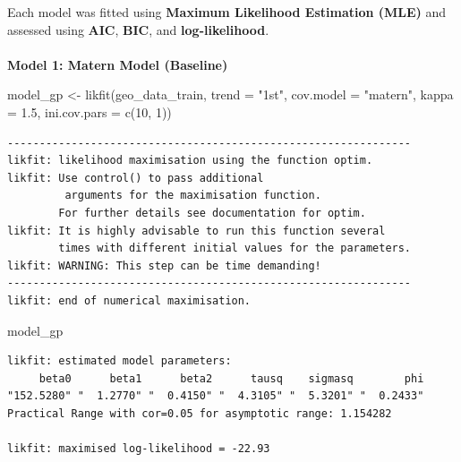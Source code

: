 \documentclass[
  11pt,
]{article}
\makeatletter
\let\oldparagraph\paragraph
\renewcommand{\paragraph}{
    \@ifstar
      \xxxParagraphStar
      \xxxParagraphNoStar
  }
\newcommand{\xxxParagraphStar}[1]{\oldparagraph*{#1}\mbox{}}
\newcommand{\xxxParagraphNoStar}[1]{\oldparagraph{#1}\mbox{}}
\newenvironment{Shaded}{\begin{snugshade}}{\end{snugshade}}
\newcommand{\AttributeTok}[1]{\textcolor[rgb]{0.40,0.45,0.13}{#1}}
\newcommand{\DecValTok}[1]{\textcolor[rgb]{0.68,0.00,0.00}{#1}}
\newcommand{\FloatTok}[1]{\textcolor[rgb]{0.68,0.00,0.00}{#1}}
\newcommand{\FunctionTok}[1]{\textcolor[rgb]{0.28,0.35,0.67}{#1}}
\newcommand{\NormalTok}[1]{\textcolor[rgb]{0.00,0.23,0.31}{#1}}
\newcommand{\OtherTok}[1]{\textcolor[rgb]{0.00,0.23,0.31}{#1}}
\newcommand{\StringTok}[1]{\textcolor[rgb]{0.13,0.47,0.30}{#1}}
\makeatother
\begin{document}
Each model was fitted using \textbf{Maximum Likelihood Estimation (MLE)}
and assessed using \textbf{AIC}, \textbf{BIC}, and
\textbf{log-likelihood}.

\paragraph{\texorpdfstring{\textbf{Model 1: Matern Model
(Baseline)}}{Model 1: Matern Model (Baseline)}}\label{model-1-matern-model-baseline}

\begin{Shaded}
\begin{Highlighting}[]
\NormalTok{model\_gp }\OtherTok{\textless{}{-}} \FunctionTok{likfit}\NormalTok{(geo\_data\_train, }\AttributeTok{trend =} \StringTok{"1st"}\NormalTok{, }\AttributeTok{cov.model =} \StringTok{"matern"}\NormalTok{, }
                   \AttributeTok{kappa =} \FloatTok{1.5}\NormalTok{, }\AttributeTok{ini.cov.pars =} \FunctionTok{c}\NormalTok{(}\DecValTok{10}\NormalTok{, }\DecValTok{1}\NormalTok{))}
\end{Highlighting}
\end{Shaded}

\begin{verbatim}
---------------------------------------------------------------
likfit: likelihood maximisation using the function optim.
likfit: Use control() to pass additional
         arguments for the maximisation function.
        For further details see documentation for optim.
likfit: It is highly advisable to run this function several
        times with different initial values for the parameters.
likfit: WARNING: This step can be time demanding!
---------------------------------------------------------------
likfit: end of numerical maximisation.
\end{verbatim}

\begin{Shaded}
\begin{Highlighting}[]
\NormalTok{model\_gp}
\end{Highlighting}
\end{Shaded}

\begin{verbatim}
likfit: estimated model parameters:
     beta0      beta1      beta2      tausq    sigmasq        phi 
"152.5280" "  1.2770" "  0.4150" "  4.3105" "  5.3201" "  0.2433" 
Practical Range with cor=0.05 for asymptotic range: 1.154282

likfit: maximised log-likelihood = -22.93
\end{verbatim}
\end{document}
